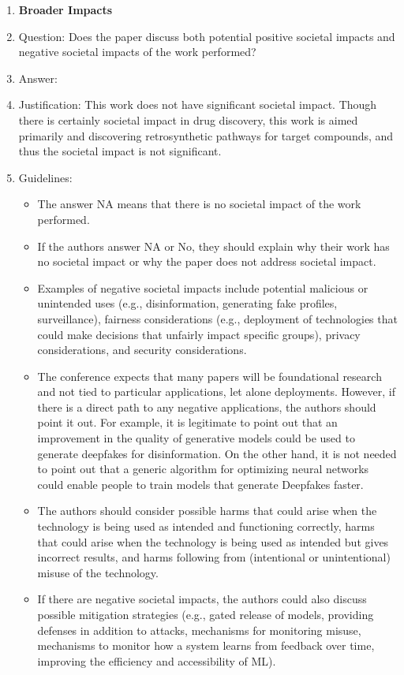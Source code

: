 \documentclass{article}
\begin{document}
\begin{enumerate}
\item {\bf Broader Impacts}
    \item[] Question: Does the paper discuss both potential positive societal impacts and negative societal impacts of the work performed?
    \item[] Answer: \answerNA{} %
    \item[] Justification: This work does not have significant societal impact. Though there is certainly societal impact in drug discovery, this work is aimed primarily and discovering retrosynthetic pathways for target compounds, and thus the societal impact is not significant.
    \item[] Guidelines:
    \begin{itemize}
        \item The answer NA means that there is no societal impact of the work performed.
        \item If the authors answer NA or No, they should explain why their work has no societal impact or why the paper does not address societal impact.
        \item Examples of negative societal impacts include potential malicious or unintended uses (e.g., disinformation, generating fake profiles, surveillance), fairness considerations (e.g., deployment of technologies that could make decisions that unfairly impact specific groups), privacy considerations, and security considerations.
        \item The conference expects that many papers will be foundational research and not tied to particular applications, let alone deployments. However, if there is a direct path to any negative applications, the authors should point it out. For example, it is legitimate to point out that an improvement in the quality of generative models could be used to generate deepfakes for disinformation. On the other hand, it is not needed to point out that a generic algorithm for optimizing neural networks could enable people to train models that generate Deepfakes faster.
        \item The authors should consider possible harms that could arise when the technology is being used as intended and functioning correctly, harms that could arise when the technology is being used as intended but gives incorrect results, and harms following from (intentional or unintentional) misuse of the technology.
        \item If there are negative societal impacts, the authors could also discuss possible mitigation strategies (e.g., gated release of models, providing defenses in addition to attacks, mechanisms for monitoring misuse, mechanisms to monitor how a system learns from feedback over time, improving the efficiency and accessibility of ML).
    \end{itemize}
    

\end{enumerate}
\end{document}
